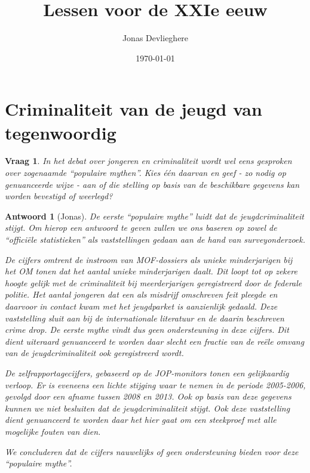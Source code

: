 \documentclass{article}
\title{Lessen voor de XXIe eeuw}
\date{\today}
\author{Jonas Devlieghere}
\theoremstyle{nonumberplain}
\newtheorem{question}{Vraag}
\newtheorem{answer}{Antwoord}
\begin{document}
\maketitle
\tableofcontents
\newpage

\section{Criminaliteit van de jeugd van tegenwoordig}

\begin{question}
In het debat over jongeren en criminaliteit wordt wel eens gesproken over
zogenaamde ``populaire mythen''. Kies één daarvan en geef - zo nodig op
genuanceerde wijze - aan of die stelling op basis van de beschikbare gegevens
kan worden bevestigd of weerlegd?
\end{question}

\begin{answer}[Jonas]

De eerste ``populaire mythe'' luidt dat de jeugdcriminaliteit stijgt. Om hierop
een antwoord te geven zullen we ons baseren op zowel de ``officiële
statistieken'' als vaststellingen gedaan aan de hand van surveyonderzoek.

De cijfers omtrent de instroom van MOF-dossiers als unieke minderjarigen bij het
OM tonen dat het aantal unieke minderjarigen daalt. Dit loopt tot op zekere
hoogte gelijk met de criminaliteit bij meerderjarigen geregistreerd door de
federale politie. Het aantal jongeren dat een als misdrijf omschreven feit
pleegde en daarvoor in contact kwam met het jeugdparket is aanzienlijk gedaald.
Deze vaststelling sluit aan bij de internationale literatuur en de daarin
beschreven crime drop. De eerste mythe vindt dus geen ondersteuning in deze
cijfers. Dit dient uiteraard genuanceerd te worden daar slecht een fractie van
de reële omvang van de jeugdcriminaliteit  ook geregistreerd wordt.

De zelfrapportagecijfers, gebaseerd op de JOP-monitors tonen een gelijkaardig
verloop. Er is eveneens een lichte stijging waar te nemen in de periode
2005-2006, gevolgd door een afname tussen 2008 en 2013. Ook op basis van deze
gegevens kunnen we niet besluiten dat de jeugdcriminaliteit stijgt. Ook deze
vaststelling dient genuanceerd te worden daar het hier gaat om een steekproef
met alle mogelijke fouten van dien.

We concluderen dat de cijfers nauwelijks of geen ondersteuning bieden voor deze
``populaire mythe''.

\end{answer}
\end{document}
